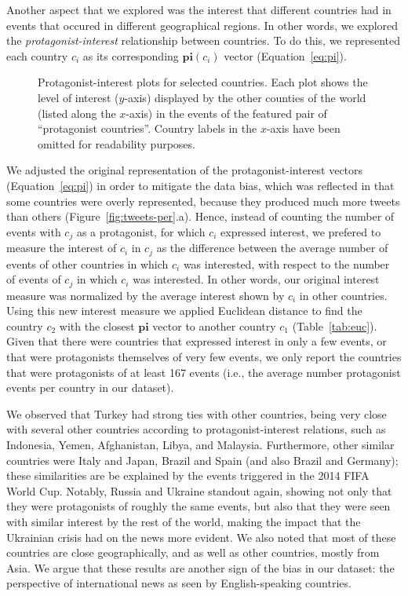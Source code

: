 
Another aspect that we explored was the interest that different
countries had in events that occured in different geographical regions. In
other words, we explored the \emph{protagonist-interest} relationship between
countries. To do this, we represented each country $c_i$ as its corresponding
$\mathbf{pi}(c_i)$ vector (Equation~\ref{eq:pi}).


\begin{figure*}[t]
\centering
\caption{Protagonist-interest plots for selected countries.  Each plot
shows the level of interest ($y$-axis) displayed by the other counties of
the world (listed along the $x$-axis) in the events of the featured pair of ``protagonist
countries''. Country labels in the $x$-axis have been omitted for
readability purposes.
}
\label{fig:int-prot}
\end{figure*}

We adjusted the original representation of the protagonist-interest vectors
(Equation~\ref{eq:pi}) in order to mitigate the data bias, which was
reflected in that some countries were overly represented, because they
produced much more tweets than others (Figure~\ref{fig:tweets-per}.a). Hence, instead of counting the number of
events with $c_j$ as a protagonist, for which $c_i$
expressed interest, we prefered to measure the interest of $c_i$ in $c_j$ as
the difference between the average number of events of other countries in which $c_i$
was interested, with respect to the number of events of $c_j$ in which $c_i$
was interested. In other words, our original interest measure was normalized
by the average interest shown by $c_i$ in other countries. Using this new
interest measure we applied Euclidean distance to find the country $c_2$ with the closest $\mathbf{pi}$
vector to another country $c_1$ (Table~\ref{tab:euc}).  Given that there were
countries that expressed interest in only a few events, or that were
protagonists themselves of very few events, we only report the countries that
were protagonists of at least 167 events (i.e., the average number protagonist
events per country in our dataset).


We observed that Turkey had strong ties with other countries, being very close
with several other countries according to protagonist-interest relations,
such as Indonesia, Yemen, Afghanistan, Libya,
and Malaysia. Furthermore, other similar countries were Italy and Japan, Brazil and Spain (and also Brazil and
Germany); these similarities are be explained by
the events triggered in the 2014 FIFA World Cup. Notably, Russia and Ukraine
standout again, showing not only that they were protagonists of roughly the
same events, but also that they were seen with similar interest by the rest
of the world, making the impact that the Ukrainian crisis had on the
news more evident.  We also noted that most of these countries are close geographically,
and as well as other countries, mostly from Asia.
We argue that these results are another sign
of the bias in our dataset: the perspective of international news
as seen by English-speaking countries.

